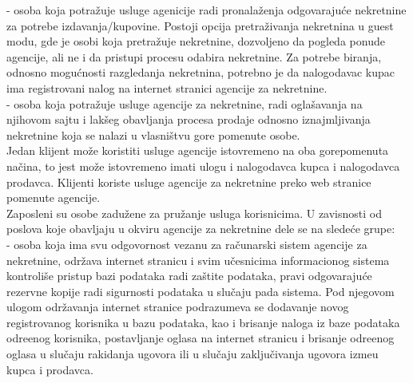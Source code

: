 \documentclass[20pt]{article}
\begin{document}
 - osoba koja potra\v {z}uje usluge agenicije radi pronala\v {z}enja odgovaraju\' ce nekretnine za potrebe izdavanja/kupovine. Postoji opcija pretra\v {z}ivanja nekretnina u guest modu, gde je osobi koja pretra\v {z}uje nekretnine, dozvoljeno da pogleda ponude agencije, ali ne i da pristupi procesu odabira nekretnine. Za potrebe biranja, odnosno mogu\' cnosti razgledanja nekretnina, potrebno je da nalogodavac kupac ima registrovani nalog na internet stranici agencije za nekretnine.\\

 - osoba koja potra\v {z}uje usluge agencije za nekretnine, radi ogla\v {s}avanja na njihovom sajtu i lak\v {s}eg obavljanja procesa prodaje odnosno iznajmljivanja nekretnine koja se nalazi u vlasni\v {s}tvu gore pomenute osobe.\\

Jedan klijent mo\v {z}e koristiti usluge agencije istovremeno na oba gorepomenuta na\v {c}ina, to jest mo\v {z}e istovremeno imati ulogu i nalogodavca kupca i nalogodavca prodavca. Klijenti koriste usluge agencije za nekretnine preko web stranice pomenute agencije.\\

\indent Zaposleni su osobe zadu\v {z}ene za pru\v {z}anje usluga korisnicima. U zavisnosti od poslova koje obavljaju u okviru agencije za nekretnine dele se na slede\' ce grupe:\\

 - osoba koja ima svu odgovornost vezanu za ra\v {c}unarski sistem agencije za nekretnine, odr\v {z}ava internet stranicu i svim u\v {c}esnicima informacionog sistema kontroli\v {s}e pristup bazi podataka radi za\v {s}tite podataka, pravi odgovaraju\' ce rezervne kopije radi sigurnosti podataka u slu\v {c}aju pada sistema. Pod njegovom ulogom odr\v {z}avanja internet stranice podrazumeva se dodavanje novog registrovanog korisnika u bazu podataka, kao i brisanje naloga iz baze podataka odre\dj enog korisnika, postavljanje oglasa na internet stranicu i brisanje odre\dj enog oglasa u slu\v {c}aju rakidanja ugovora ili u slu\v {c}aju zaklju\v {c}ivanja ugovora izme\dj u kupca i prodavca.\\
\end{document}
